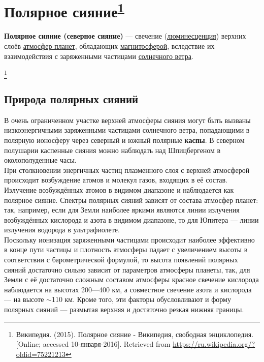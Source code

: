 \documentclass[a4paper,14pt]{article}
\def \lumURL {https://ru.wikipedia.org/wiki/\%D0\%9B\%D1\%8E\%D0\%BC\%D0\%B8\%D0\%BD\%D0\%B5\%D1\%81\%D1\%86\%D0\%B5\%D0\%BD\%D1\%86\%D0\%B8\%D1\%8F}
\def \atmURL {https://ru.wikipedia.org/wiki/\%D0\%90\%D1\%82\%D0\%BC\%D0\%BE\%D1\%81\%D1\%84\%D0\%B5\%D1\%80\%D0\%B0}
\def \magURL {https://ru.wikipedia.org/wiki/\%D0\%9C\%D0\%B0\%D0\%B3\%D0\%BD\%D0\%B8\%D1\%82\%D0\%BE\%D1\%81\%D1\%84\%D0\%B5\%D1\%80\%D0\%B0}
\def \sovURL {https://ru.wikipedia.org/wiki/\%D0\%A1\%D0\%BE\%D0\%BB\%D0\%BD\%D0\%B5\%D1\%87\%D0\%BD\%D1\%8B\%D0\%B9_\%D0\%B2\%D0\%B5\%D1\%82\%D0\%B5\%D1\%80}
\begin{document}
\newcommand{\stoptocwriting}{\addtocontents{toc}{\protect\setcounter{tocdepth}{-5}}}
\newcommand{\resumetocwriting}{\addtocontents{toc}{\protect\setcounter{tocdepth}{\arabic{tocdepth}}}}

\setcounter{secnumdepth}{0} %

\stoptocwriting
\section{Полярное сияние\textsuperscript{\ref{mynote}}}
\resumetocwriting
\textbf{Полярное сияние (северное сияние)} — свечение (\href{\lumURL}{люминесценция}) верхних слоёв \href{\atmURL}{атмосфер планет}, 
обладающих \href{\magURL}{магнитосферой}, вследствие их взаимодействия с заряженными частицами \href{\sovURL}{солнечного ветра}.

\tableofcontents

\footnote{\label{mynote}Википедия. (2015). Полярное сияние - Википедия, свободная энциклопедия. [Online; accessed 10-января-2016]. Retrieved
from \href{https://ru.wikipedia.org/?oldid=75221213}{https://ru.wikipedia.org/?oldid=75221213}}

\subsection{Природа полярных сияний}
В очень ограниченном участке верхней атмосферы сияния могут быть вызваны низкоэнергичными заряженными частицами 
солнечного ветра, попадающими в полярную ионосферу через северный и южный полярные \textbf{каспы}. В северном полушарии 
каспенные сияния можно наблюдать над Шпицбергеном в околополуденные часы. \\
\indent При столкновении энергичных частиц плазменного слоя с верхней атмосферой происходит возбуждение атомов и молекул газов,
входящих в её состав. Излучение возбуждённых атомов в видимом диапазоне и наблюдается как полярное сияние. Спектры 
полярных сияний зависят от состава атмосфер планет: так, например, если для Земли наиболее яркими являются линии излучения 
возбуждённых кислорода и азота в видимом диапазоне, то для Юпитера — линии излучения водорода в ультрафиолете. \\
\indent Поскольку ионизация заряженными частицами происходит наиболее эффективно в конце пути частицы и плотность атмосферы
падает с увеличением высоты в соответствии с барометрической формулой, то высота появлений полярных сияний достаточно
сильно зависит от параметров атмосферы планеты, так, для Земли с её достаточно сложным составом атмосферы красное
свечение кислорода наблюдается на высотах 200—400 км, а совместное свечение азота и кислорода — на высоте $\sim$110 км.
Кроме того, эти факторы обусловливают и форму полярных сияний — размытая верхняя и достаточно резкая нижняя границы.
\end{document}
